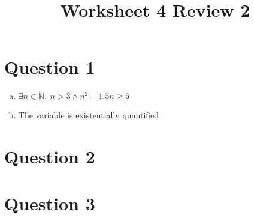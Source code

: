 \documentclass[12pt]{article}
\begin{document}
\title{Worksheet 4 Review 2}
\maketitle

\section*{Question 1}
\begin{enumerate}[a.]
    \item $\exists n \in \mathbb{N},\:n > 3 \land n^2 -1.5n \geq 5$
    \item The variable is existentially quantified
\end{enumerate}

\section*{Question 2}

\section*{Question 3}
\end{document}
